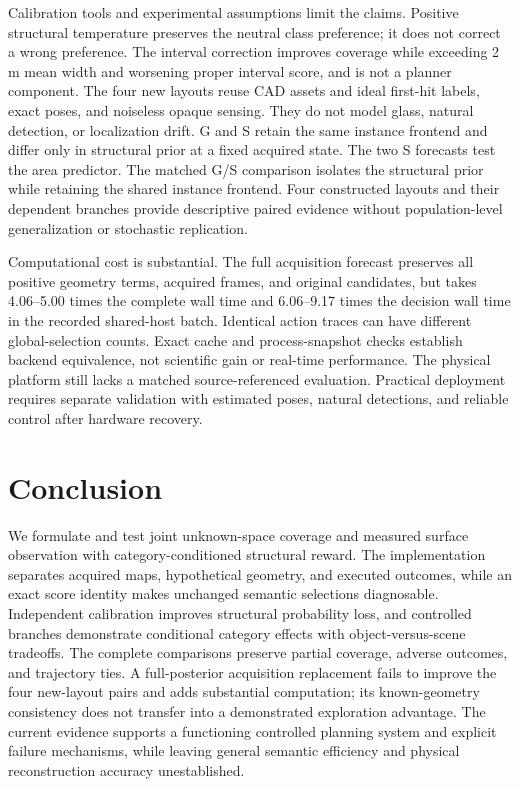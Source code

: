Calibration tools and experimental assumptions limit the claims. Positive structural temperature preserves the neutral class preference; it does not correct a wrong preference. The interval correction improves coverage while exceeding 2\,m mean width and worsening proper interval score, and is not a planner component. The four new layouts reuse CAD assets and ideal first-hit labels, exact poses, and noiseless opaque sensing. They do not model glass, natural detection, or localization drift. G and S retain the same instance frontend and differ only in structural prior at a fixed acquired state. The two S forecasts test the area predictor. The matched G/S comparison isolates the structural prior while retaining the shared instance frontend. Four constructed layouts and their dependent branches provide descriptive paired evidence without population-level generalization or stochastic replication.

Computational cost is substantial. The full acquisition forecast preserves all positive geometry terms, acquired frames, and original candidates, but takes 4.06--5.00 times the complete wall time and 6.06--9.17 times the decision wall time in the recorded shared-host batch. Identical action traces can have different global-selection counts. Exact cache and process-snapshot checks establish backend equivalence, not scientific gain or real-time performance. The physical platform still lacks a matched source-referenced evaluation. Practical deployment requires separate validation with estimated poses, natural detections, and reliable control after hardware recovery.

\section{Conclusion}\label{conclusion}
We formulate and test joint unknown-space coverage and measured surface observation with category-conditioned structural reward. The implementation separates acquired maps, hypothetical geometry, and executed outcomes, while an exact score identity makes unchanged semantic selections diagnosable. Independent calibration improves structural probability loss, and controlled branches demonstrate conditional category effects with object-versus-scene tradeoffs. The complete comparisons preserve partial coverage, adverse outcomes, and trajectory ties. A full-posterior acquisition replacement fails to improve the four new-layout pairs and adds substantial computation; its known-geometry consistency does not transfer into a demonstrated exploration advantage. The current evidence supports a functioning controlled planning system and explicit failure mechanisms, while leaving general semantic efficiency and physical reconstruction accuracy unestablished.


